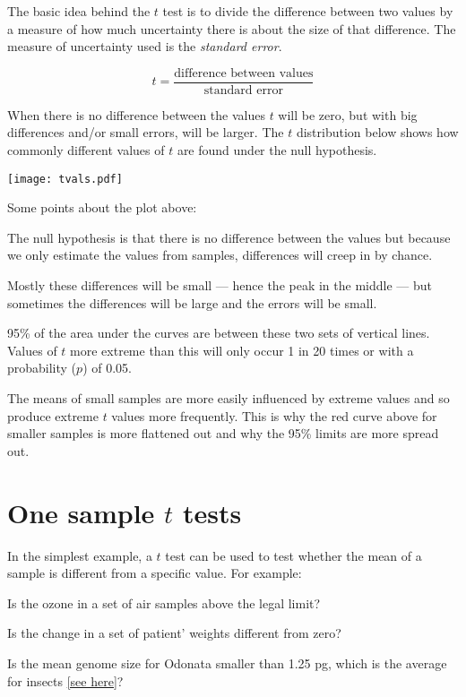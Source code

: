 The basic idea  behind the $t$ test is to divide the difference between 
two values by a measure of how much uncertainty there is about the size 
of that difference. The measure of uncertainty used is the 
\emph{standard error}.

\[
	t=\frac{\textrm{difference between values}}{\textrm{standard error}}
\]

When there is no difference between the values $t$ will be zero, but 
with big differences and/or small errors, will be larger. The $t$ 
distribution below shows how commonly different values of $t$ are found 
under the null hypothesis. 
\begin{center}
\texttt{[image: tvals.pdf]} 
\end{center}
 
Some points about the plot above:
\begin{compactitem}
	\item The  null hypothesis is that there is no difference between the 
	values but because we only estimate the values from samples, 
	differences will creep in by chance.
	\item Mostly these differences will be small --- hence the peak in 
	the middle --- but sometimes the differences will be large and the 
	errors will be small.
	\item 95\% of the area under the curves are between these two sets of 
	vertical lines. Values of $t$ more extreme than this will only occur 
	1 in 20 times or with a probability ($p$) of 0.05.
	\item The means of small samples are more easily influenced by 
	extreme values and so produce extreme $t$ values more frequently. 
	This is why the red curve above for smaller samples is more flattened 
	out and why the 95\% limits are more spread out.
\end{compactitem}

\section{One sample $t$ tests}

In the simplest example, a $t$ test can be used to test whether the 
mean of a sample is different from a specific value. For example:

\begin{compactitem}
	\item Is the ozone in a set of air samples above the legal limit?
	\item Is the change in a set of patient' weights different from zero?
	\item Is the mean genome size for Odonata smaller than 1.25 pg, which 
	is the average for insects 
	\href{http://www.genomesize.com/statistics.php?stats=insects}{[see 
	here]}?
\end{compactitem}

